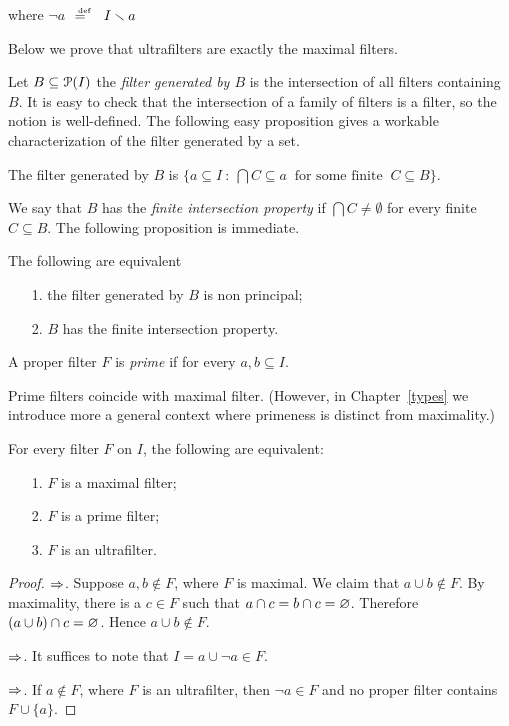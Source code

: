 \documentclass[creche.tex]{subfiles}
\begin{document}
\hfill where \emph{$\neg a$}$\ \ \deq\ \ I\sm a$


Below we prove that ultrafilters are exactly the maximal filters.

Let $B\subseteq\P(I)$ the \emph{filter generated by $B$\/} is the intersection of all filters containing $B$. It is easy to check that the intersection of a family of filters is a filter, so the notion is well-defined. The following easy proposition gives a workable characterization of the filter generated by a set.

\begin{proposition} The filter generated by $B$ is $\big\{a\subseteq I\ :\ \bigcap C\subseteq a\ \textrm{ for some finite }\ C\subseteq B\big\}$.\QED

\end{proposition}

We say that $B$ has the \emph{finite intersection property\/} if $\bigcap C\neq\emptyset$ for every finite $C\subseteq B$. The following proposition is immediate.

\begin{proposition} The following are equivalent
\begin{itemize}
\item[1.] the filter generated by $B$ is non principal;
\item[2.] $B$ has the finite intersection property.\QED
\end{itemize}
\end{proposition}




A proper filter $F$ is \emph{prime\/} if for every $a,b\subseteq I$.


Prime filters coincide with maximal filter. (However, in Chapter~\ref{types} we introduce more a general context where primeness is distinct from maximality.)

\begin{proposition}
For every filter $F$ on $I$, the following are equivalent:
\begin{itemize}
\item[1.] $F$ is a maximal filter;
\item[2.] $F$ is a prime filter;
\item[3.] $F$ is an ultrafilter.
\end{itemize}
\end{proposition}
\begin{proof}
$\IMP$. Suppose $a,b\notin F$, where $F$ is maximal. We claim that $a\cup b\notin F$. By maximality, there is a $c\in F$ such that $a\cap c= b\cap c= \0$. Therefore $(a\cup b)\cap c= \0$. Hence  $a\cup b\notin F$. 

$\IMP$. It suffices to note that $I=a\cup \neg a\in F$. 

$\IMP$. If $a\notin F$, where $F$ is an ultrafilter, then $\neg a\in F$ and no proper filter contains $F\cup\{a\}$.
\end{proof}
\end{document}
